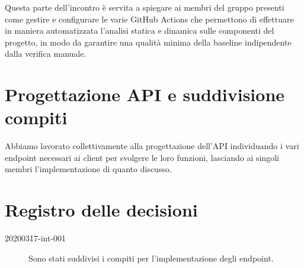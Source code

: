 \documentclass{article}
\begin{document}
Questa parte dell'incontro è servita a spiegare ai membri del gruppo presenti come gestire e configurare le varie GitHub Actions che permettono di effettuare in maniera automatizzata l'analisi statica e dinamica sulle componenti del progetto, in modo da garantire una qualità minima della baseline indipendente dalla verifica manuale.


\section{Progettazione API e suddivisione compiti}%
\label{sec:progettazione_api_e_suddivisione_compiti}

Abbiamo lavorato collettivamente alla progettazione dell'API individuando i vari endpoint necessari ai client per svolgere le loro funzioni, lasciando ai singoli membri l'implementazione di quanto discusso.


\newpage
\section{Registro delle decisioni}%
\label{sec:registro_delle_decisioni}

\begin{description}
  \item[20200317-int-001] Sono stati suddivisi i compiti per l'implementazione degli endpoint.
\end{description}

\end{document}
